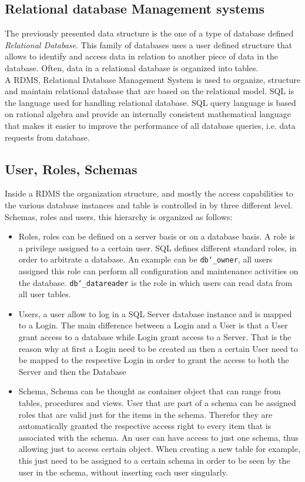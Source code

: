 \documentclass[../main.tex]{subfiles}
\begin{document}
\subsection{Relational database Management systems}
The previously presented data structure is the one of a type of database defined \textit{Relational Database}. This family of databases uses a user defined structure that allows to identify and access data in relation to another piece of data in the database. Often, data in a relational database is organized into tables.\\ A \gls{RDMS}, Relational Database Management System is used to organize, structure and maintain relational database that are based on the relational model. \gls{SQL} is the language used for handling relational database. \gls{SQL} query language is based on rational algebra and provide an internally consistent mathematical language that makes it easier to improve the performance of all database queries, i.e. data requests from database.
\subsection{User, Roles, Schemas}
Inside a \gls{RDMS} the organization structure, and mostly the access capabilities to the various database instances and table is controlled in by three different level. Schemas, roles and users, this hierarchy is organized as follows:
\begin{itemize}
    \item Roles, roles can be defined on a server basis or on a database basis. A role is a privilege assigned to a certain user. \gls{SQL} defines different standard roles, in order to arbitrate a database. An example can be \texttt{db\char`_owner}, all users assigned this role can perform all configuration and maintenance activities on the database. \texttt{db\char`_datareader} is the role in which users can read data from all user tables. 
    \item Users, a user allow to log in a SQL Server database instance and is mapped to a Login. The main difference between a Login and a User is that a User grant access to a database while Login grant access to a Server. That is the reason why at first a Login need to be created an then a certain User need to be mapped to the respective Login in order to grant the access to both the Server and then the Database
    \item Schema, Schema can be thought as container object that can range from tables, procedures and views. User that are part of a schema can be assigned roles that are valid just for the items in the schema. Therefor they are automatically granted the respective access right to every item that is associated with the schema. An user can have access to just one schema, thus allowing just to access certain object. When creating a new table for example, this just need to be assigned to a certain schema in order to be seen by the user in the schema, without inserting each user singularly. 
\end{itemize}
\end{document}
